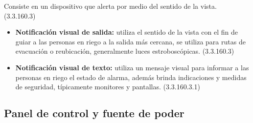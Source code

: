 Consiste en un dispositivo que alerta por medio del sentido de la vista. (3.3.160.3)


\begin{itemize}
	
	\item \textbf{Notificación visual de salida:} utiliza el sentido de la vista con el fin de guiar a las personas en riego a la salida más cercana, se utiliza para rutas de evacuación o reubicación, generalmente luces estroboscópicas. (3.3.160.3)
	
	\item \textbf{Notificación visual de texto:} utiliza un mensaje visual para informar a las personas en riego el estado de alarma, además brinda indicaciones y medidas de seguridad, típicamente monitores y pantallas. (3.3.160.3.1)
	
\end{itemize}



\subsection{Panel de control y fuente de poder}



